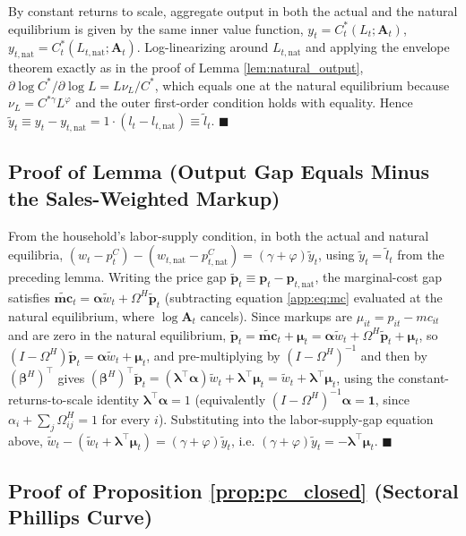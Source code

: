 \documentclass[12pt]{article}
\begin{document}
By constant returns to scale, aggregate output in both the actual and the natural equilibrium is
given by the same inner value function, $y_t=C_t^*(L_t;\mathbf A_t)$,
$y_{t,\mathrm{nat}}=C_t^*(L_{t,\mathrm{nat}};\mathbf A_t)$. Log-linearizing around $L_{t,\mathrm{nat}}$
and applying the envelope theorem exactly as in the proof of Lemma \ref{lem:natural_output},
$\partial\log C^*/\partial\log L = L\nu_L/C^*$, which equals one at the natural equilibrium because
$\nu_L=C^{*\gamma}L^\varphi$ and the outer first-order condition holds with equality. Hence
$\tilde y_t\equiv y_t-y_{t,\mathrm{nat}} = 1\cdot(l_t-l_{t,\mathrm{nat}})\equiv\tilde l_t$.
$\blacksquare$

\subsection{Proof of Lemma (Output Gap Equals Minus the Sales-Weighted Markup)}

From the household's labor-supply condition, in both the actual and natural equilibria,
$(w_t-p_t^C)-(w_{t,\mathrm{nat}}-p_{t,\mathrm{nat}}^C)=(\gamma+\varphi)\tilde y_t$, using
$\tilde y_t=\tilde l_t$ from the preceding lemma. Writing the price gap
$\tilde{\bm p}_t\equiv\bm p_t-\bm p_{t,\mathrm{nat}}$, the marginal-cost gap satisfies
$\tilde{\bm{mc}}_t=\bm\alpha\tilde w_t+\Omega^H\tilde{\bm p}_t$ (subtracting equation
\eqref{app:eq:mc} evaluated at the natural equilibrium, where $\log\mathbf A_t$ cancels). Since markups
are $\mu_{it}=p_{it}-mc_{it}$ and are zero in the natural equilibrium,
$\tilde{\bm p}_t=\tilde{\bm{mc}}_t+\bm\mu_t=\bm\alpha\tilde w_t+\Omega^H\tilde{\bm p}_t+\bm\mu_t$, so
$(I-\Omega^H)\tilde{\bm p}_t=\bm\alpha\tilde w_t+\bm\mu_t$, and pre-multiplying by
$(I-\Omega^H)^{-1}$ and then by $(\bm\beta^H)^\top$ gives $(\bm\beta^H)^\top\tilde{\bm p}_t =
(\bm\lambda^\top\bm\alpha)\tilde w_t + \bm\lambda^\top\bm\mu_t = \tilde w_t + \bm\lambda^\top\bm\mu_t$,
using the constant-returns-to-scale identity $\bm\lambda^\top\bm\alpha=1$ (equivalently
$(I-\Omega^H)^{-1}\bm\alpha=\mathbf 1$, since $\alpha_i+\sum_j\Omega^H_{ij}=1$ for every $i$).
Substituting into the labor-supply-gap equation above,
$\tilde w_t - (\tilde w_t+\bm\lambda^\top\bm\mu_t)=(\gamma+\varphi)\tilde y_t$, i.e.
$(\gamma+\varphi)\tilde y_t=-\bm\lambda^\top\bm\mu_t$. $\blacksquare$

\subsection{Proof of Proposition \ref{prop:pc_closed} (Sectoral Phillips Curve)}
\end{document}
